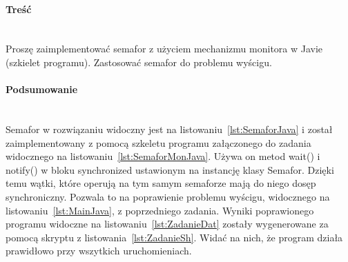 \paragraph{Treść}~\\
Proszę zaimplementować semafor z użyciem mechanizmu monitora w Javie (szkielet programu).
Zastosować semafor do problemu wyścigu.











\paragraph{Podsumowanie}~\\
Semafor w rozwiązaniu widoczny jest na listowaniu~\ref{lst:SemaforJava} i został zaimplementowany z pomocą szkeletu programu załączonego do zadania widocznego na listowaniu~\ref{lst:SemaforMonJava}.
Używa on metod wait() i notify() w bloku synchronized ustawionym na instancję klasy Semafor.
Dzięki temu wątki, które operują na tym samym semaforze mają do niego dosęp synchroniczny.
Pozwala to na poprawienie problemu wyścigu, widocznego na listowaniu~\ref{lst:MainJava}, z poprzedniego zadania.
Wyniki poprawionego programu widoczne na listowaniu~\ref{lst:ZadanieDat} zostały wygenerowane za pomocą skryptu z listowania~\ref{lst:ZadanieSh}.
Widać na nich, że program działa prawidłowo przy wszytkich uruchomieniach.
